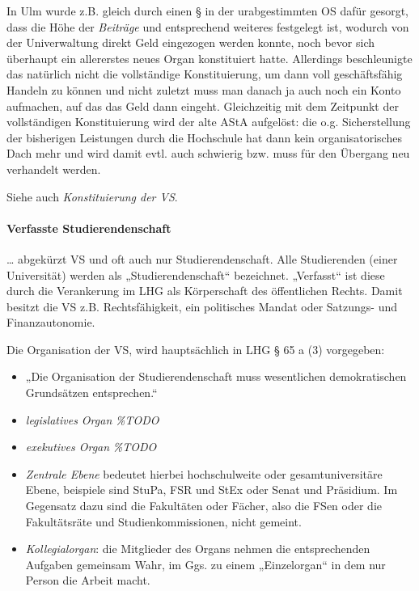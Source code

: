 \documentclass[
10pt,
a4paper,
twoside,								%
titlepage=false,							%
draft=false								%
]{scrartcl}
\begin{document}
In Ulm wurde z.B. gleich durch einen § in der urabgestimmten OS dafür gesorgt, dass die Höhe der \emph{Beiträge} und entsprechend weiteres festgelegt ist, wodurch von der Univerwaltung direkt Geld eingezogen werden konnte, noch bevor sich überhaupt ein allererstes neues Organ konstituiert hatte. Allerdings beschleunigte das natürlich nicht die vollständige Konstituierung, um dann voll geschäftsfähig Handeln zu können und nicht zuletzt muss man danach ja auch noch ein Konto aufmachen, auf das das Geld dann eingeht. Gleichzeitig mit dem Zeitpunkt der vollständigen Konstituierung wird der alte AStA aufgelöst: die o.g. Sicherstellung der bisherigen Leistungen durch die Hochschule hat dann kein organisatorisches Dach mehr und wird damit evtl. auch schwierig bzw. muss für den Übergang neu verhandelt werden.

Siehe auch \emph{Konstituierung der VS}.



\paragraph{Verfasste Studierendenschaft}

… abgekürzt VS und oft auch nur Studierendenschaft. Alle Studierenden (einer Universität) werden als „Studierendenschaft“ bezeichnet. „Verfasst“ ist diese durch die Verankerung im LHG als Körperschaft des öffentlichen Rechts. Damit besitzt die VS z.B. Rechtsfähigkeit, ein politisches Mandat oder Satzungs- und Finanzautonomie.

Die Organisation der VS, wird hauptsächlich in LHG § 65 a (3) vorgegeben:
\begin{itemize}
	\item „Die Organisation der Studierendenschaft muss wesentlichen demokratischen Grundsätzen entsprechen.“
	\item \emph{legislatives Organ} \textit{\%TODO}
	\item \emph{exekutives Organ} \textit{\%TODO}
	\item \emph{Zentrale Ebene} bedeutet hierbei hochschulweite oder gesamtuniversitäre Ebene, beispiele sind StuPa, FSR und StEx oder Senat und Präsidium. Im Gegensatz dazu sind die Fakultäten oder Fächer, also die FSen oder die Fakultätsräte und Studienkommissionen, nicht gemeint.
	\item \emph{Kollegialorgan}: die Mitglieder des Organs nehmen die entsprechenden Aufgaben gemeinsam Wahr, im Ggs. zu einem „Einzelorgan“ in dem nur Person die Arbeit macht.
\end{itemize}
\end{document}
